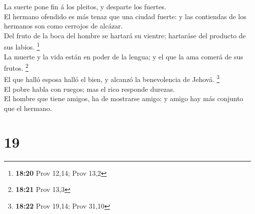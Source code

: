  La suerte pone fin á los pleitos, y desparte los
fuertes.\\
 El hermano ofendido es más tenaz que una ciudad fuerte: y
las contiendas de los hermanos son como cerrojos de alcázar.\\
 Del fruto de la boca del hombre se hartará su vientre;
hartaráse del producto de sus labios. \footnote{\textbf{18:20} Prov
  12,14; Prov 13,2}\\
 La muerte y la vida están en poder de la lengua; y el que
la ama comerá de sus frutos. \footnote{\textbf{18:21} Prov 13,3}\\
 El que halló esposa halló el bien, y alcanzó la
benevolencia de Jehová. \footnote{\textbf{18:22} Prov 19,14; Prov 31,10}\\
 El pobre habla con ruegos; mas el rico responde durezas.\\
 El hombre que tiene amigos, ha de mostrarse amigo: y amigo
hay más conjunto que el hermano.

\hypertarget{section-18}{%
\section{19}\label{section-18}}

